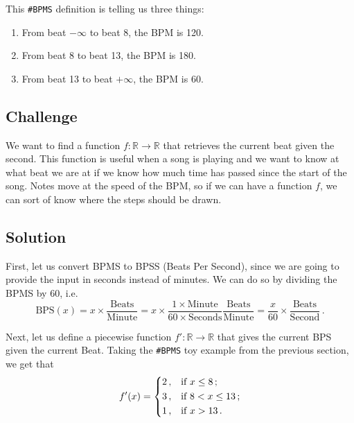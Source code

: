 \documentclass[a4paper,9pt]{article}
\begin{document}
    This \texttt{\#BPMS} definition is telling us three things:
    \begin{enumerate}
	    \item From beat $- \infty$ to beat 8, the BPM is 120.
	    \item From beat 8 to beat 13, the BPM is 180.
	    \item From beat 13 to beat $+\infty$, the BPM is 60.
    \end{enumerate}

    \subsection{Challenge}

    We want to find a function $f : \mathbb{R} \rightarrow \mathbb{R}$ that retrieves the current beat given the second.  This function is useful when a song is playing and we want to know at what beat we are at if we know how much time has passed since the start of the song. Notes move at the speed of the BPM, so if we can have a function $f$, we can sort of know where the steps should be drawn.

    \subsection{Solution}

    First, let us convert BPMS to BPSS (Beats Per Second), since we are going to provide the input in seconds instead of minutes. We can do so by dividing the BPMS by 60, i.e.
    \begin{equation}
	    \text{BPS}(x) = x \times \frac{\text{Beats}}{\text{Minute}} = x \times \frac{1 \times \text{Minute}}{60 \times \text{Seconds}} \frac{\text{Beats}}{\text{Minute}} = \frac{x}{60} \times \frac{\text{Beats}}{\text{Second}}\,. 
	    \label{eq:bpm2bps}
    \end{equation}

    Next, let us define a piecewise function $f': \mathbb{R} \rightarrow \mathbb{R}$ that gives the current BPS given the current Beat. Taking the \texttt{\#BPMS} toy example from the previous section, we get that
    \begin{equation}
	    f'(x) = \begin{dcases}
		    2\,, & \text{if $x \leq 8\,;$}\\ 
		    3\,, & \text{if $8 < x \leq 13\,;$}\\ 
		    1\,, & \text{if $x > 13\,.$}\\ 
	    \end{dcases}
	    \label{eq:beat2bps}
    \end{equation}
\end{document}
